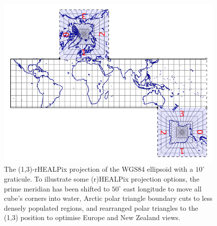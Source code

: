 \documentclass[12pt]{iopart}
\begin{document}
\begin{figure}[!htb] 
\centering
\includegraphics[width=\textwidth]{fig-projections_rhealpix_13_50deg.png}
\caption{The (1,3)-rHEALPix projection of the WGS84 ellipsoid with a $10^\circ$ graticule.
To illustrate some (r)HEALPix projection options, the prime meridian has been shifted to $50^\circ$ east longitude to move all cube's corners into water, Arctic polar triangle boundary cuts to less densely populated regions, and rearranged polar triangles to the (1,3) position to optimise Europe and New Zealand views.}
\label{fig:cube}
\end{figure}
\end{document}
